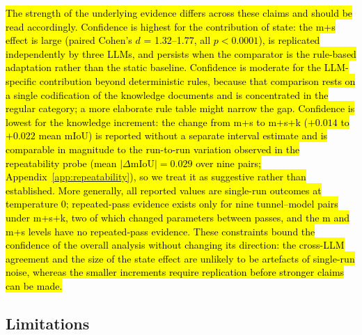 \documentclass[a4paper,fleqn]{cas-dc}
\begin{document}
\hl{The strength of the underlying evidence differs across these claims and should be read accordingly. Confidence is highest for the contribution of state: the m+s effect is large (paired Cohen's \mbox{$d$} = 1.32--1.77, all $p<0.0001$), is replicated independently by three LLMs, and persists when the comparator is the rule-based adaptation rather than the static baseline. Confidence is moderate for the LLM-specific contribution beyond deterministic rules, because that comparison rests on a single codification of the knowledge documents and is concentrated in the regular category; a more elaborate rule table might narrow the gap. Confidence is lowest for the knowledge increment: the change from m+s to m+s+k ($+0.014$ to $+0.022$ mean mIoU) is reported without a separate interval estimate and is comparable in magnitude to the run-to-run variation observed in the repeatability probe (mean $|\Delta\mathrm{mIoU}| = 0.029$ over nine pairs; Appendix~\ref{app:repeatability}), so we treat it as suggestive rather than established. More generally, all reported values are single-run outcomes at temperature 0; repeated-pass evidence exists only for nine tunnel--model pairs under m+s+k, two of which changed parameters between passes, and the m and m+s levels have no repeated-pass evidence. These constraints bound the confidence of the overall analysis without changing its direction: the cross-LLM agreement and the size of the state effect are unlikely to be artefacts of single-run noise, whereas the smaller increments require replication before stronger claims can be made.}


\subsection{Limitations}\label{sec:limitations}
\end{document}
